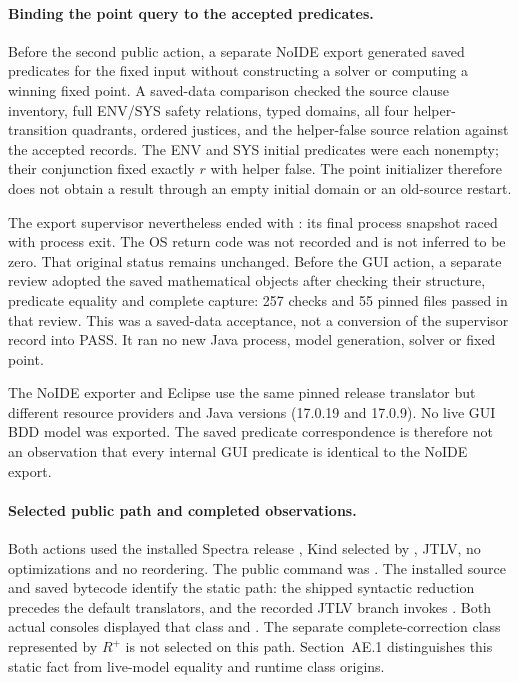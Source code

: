 \paragraph{Binding the point query to the accepted predicates.}
Before the second public action, a separate NoIDE export generated
saved predicates for the fixed input without constructing a solver or
computing a winning fixed point. A saved-data comparison checked the
source clause inventory, full ENV/SYS safety relations, typed domains,
all four helper-transition quadrants, ordered justices, and the
helper-false source relation against the accepted records. The ENV and
SYS initial predicates were each nonempty; their conjunction fixed
exactly $r$ with helper false. The point initializer therefore does not
obtain a result through an empty initial domain or an old-source restart.

The export supervisor nevertheless ended with
: its final process snapshot raced
with process exit. The OS return code was not recorded and is not
inferred to be zero. That original status remains unchanged. Before
the GUI action, a separate review adopted the saved mathematical objects
after checking their structure, predicate equality and complete capture:
257 checks and 55 pinned files passed in that review. This was a
saved-data acceptance, not a conversion of the supervisor record into
PASS. It ran no new Java process, model generation, solver or fixed point.

The NoIDE exporter and Eclipse use the same pinned release translator
but different resource providers and Java versions (17.0.19 and 17.0.9).
No live GUI BDD model was exported. The saved predicate correspondence
is therefore not an observation that every internal GUI predicate is
identical to the NoIDE export.

\paragraph{Selected public path and completed observations.}
Both actions used the installed Spectra release
, Kind selected by
, JTLV, no optimizations and no
reordering. The public command was .
The installed source and saved bytecode identify the static path: the shipped
syntactic reduction precedes the default translators, and the recorded JTLV
branch invokes . Both actual consoles displayed that
class and . The separate complete-correction class
represented by $R^+$ is not selected on this path. Section~AE.1 distinguishes
this static fact from live-model equality and runtime class origins.

